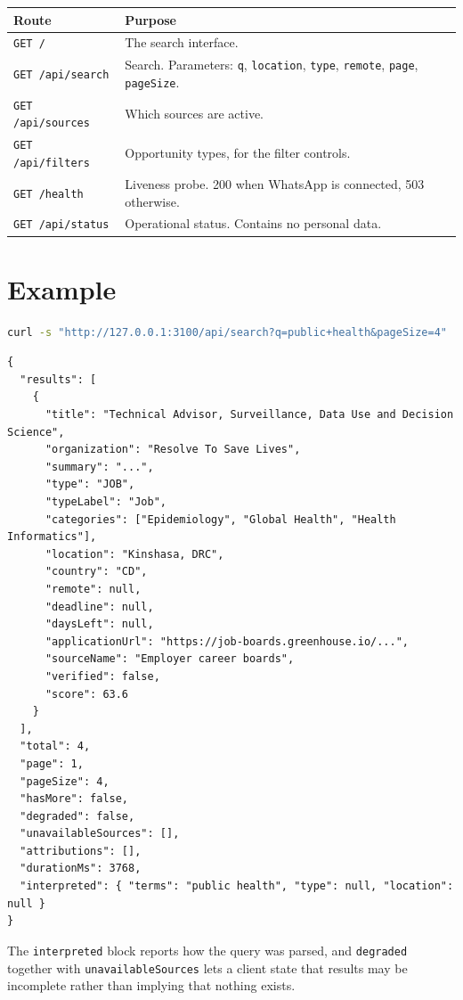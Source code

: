 \documentclass[11pt,a4paper]{report}
\begin{document}
\begin{center}
\begin{tabularx}{\textwidth}{@{}lX@{}}
\toprule
\textbf{Route} & \textbf{Purpose} \\
\midrule
\texttt{GET /} & The search interface. \\
\texttt{GET /api/search} & Search. Parameters: \texttt{q}, \texttt{location},
\texttt{type}, \texttt{remote}, \texttt{page}, \texttt{pageSize}. \\
\texttt{GET /api/sources} & Which sources are active. \\
\texttt{GET /api/filters} & Opportunity types, for the filter controls. \\
\texttt{GET /health} & Liveness probe. 200 when WhatsApp is connected,
503 otherwise. \\
\texttt{GET /api/status} & Operational status. Contains no personal data. \\
\bottomrule
\end{tabularx}
\end{center}

\section{Example}

\begin{lstlisting}[language=bash]
curl -s "http://127.0.0.1:3100/api/search?q=public+health&pageSize=4"
\end{lstlisting}

\begin{lstlisting}
{
  "results": [
    {
      "title": "Technical Advisor, Surveillance, Data Use and Decision Science",
      "organization": "Resolve To Save Lives",
      "summary": "...",
      "type": "JOB",
      "typeLabel": "Job",
      "categories": ["Epidemiology", "Global Health", "Health Informatics"],
      "location": "Kinshasa, DRC",
      "country": "CD",
      "remote": null,
      "deadline": null,
      "daysLeft": null,
      "applicationUrl": "https://job-boards.greenhouse.io/...",
      "sourceName": "Employer career boards",
      "verified": false,
      "score": 63.6
    }
  ],
  "total": 4,
  "page": 1,
  "pageSize": 4,
  "hasMore": false,
  "degraded": false,
  "unavailableSources": [],
  "attributions": [],
  "durationMs": 3768,
  "interpreted": { "terms": "public health", "type": null, "location": null }
}
\end{lstlisting}

The \texttt{interpreted} block reports how the query was parsed, and
\texttt{degraded} together with \texttt{unavailableSources} lets a client state
that results may be incomplete rather than implying that nothing exists.
\end{document}
